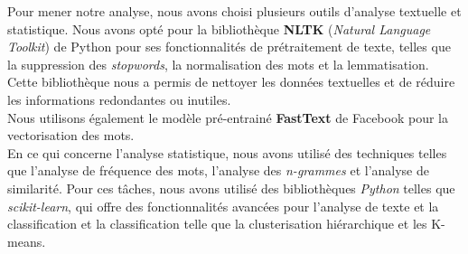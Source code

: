 \vspace{\baselineskip}
\hspace{0,5cm}Pour mener notre analyse, nous avons choisi plusieurs outils d'analyse textuelle
et statistique. Nous avons opté pour la bibliothèque \textbf{NLTK} (\textit{Natural Language
Toolkit}) de Python pour ses fonctionnalités de prétraitement de texte, telles
que la suppression des \textit{stopwords}, la normalisation des mots et la lemmatisation.
Cette bibliothèque nous a permis de nettoyer les données textuelles et de
réduire les informations redondantes ou inutiles.
\\Nous utilisons également le modèle pré-entrainé \textbf{FastText} de Facebook
pour la vectorisation des mots.
\\En ce qui concerne l'analyse statistique, nous avons utilisé des techniques
telles que l'analyse de fréquence des mots, l'analyse des \textit{n-grammes} et l'analyse
de similarité. Pour ces tâches, nous avons utilisé des bibliothèques \textit{Python}
telles que \textit{scikit-learn}, qui offre des fonctionnalités avancées pour l'analyse
de texte et la classification et la classification telle que la clusterisation
hiérarchique et les K-means.
